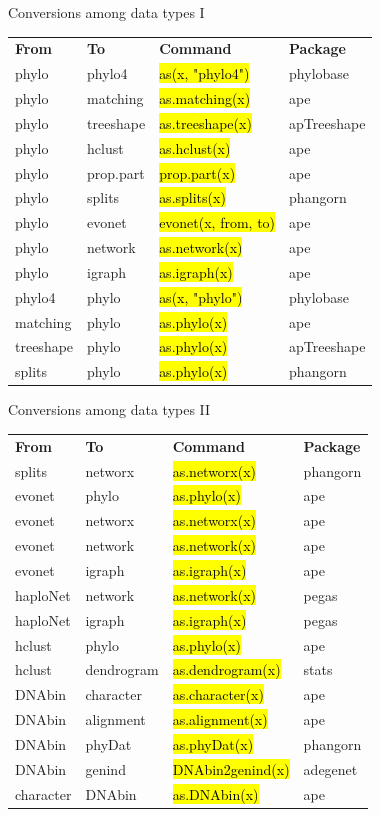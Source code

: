 \documentclass[compress, ucs, xelatex, 11pt, xcolor=svgnames,
  hyperref={
    bookmarks=true,
    unicode=true,
    colorlinks=true,
    pdftitle={Molecular data in R},
    plainpages=false,
    pdfauthor={Vojtech Zeisek},
    pdfsubject={Course about phylogeny and evolution in R},
    pdfcreator={XeLaTeX},
    pdfkeywords={R, evolution, phylogeny, molecular data},
    linkcolor=Tomato,
    anchorcolor=SaddleBrown,
    citecolor=Goldenrod,
    filecolor=DarkMagenta,
    menucolor=Sienna,
    urlcolor=DarkTurquoise,
    pdftex},
  url={hyphens, lowtilde} %
  ]{beamer}
\renewcommand{\texttt}[1]{\hl{\ttfamily #1}}
\begin{document}
\begin{frame}{Conversions among data types I}
  \begin{tabular}{llll}
    \textbf{From} & \textbf{To} & \textbf{Command} & \textbf{Package}\\
    phylo & phylo4 & \texttt{as(x, "phylo4")} & phylobase\\
    phylo & matching & \texttt{as.matching(x)} & ape\\
    phylo & treeshape & \texttt{as.treeshape(x)} & apTreeshape\\
    phylo & hclust & \texttt{as.hclust(x)} & ape\\
    phylo & prop.part & \texttt{prop.part(x)} & ape\\
    phylo & splits & \texttt{as.splits(x)} & phangorn\\
    phylo & evonet & \texttt{evonet(x, from, to)} & ape\\
    phylo & network & \texttt{as.network(x)} & ape\\
    phylo & igraph & \texttt{as.igraph(x)} & ape\\
    phylo4 & phylo & \texttt{as(x, "phylo")} & phylobase\\
    matching & phylo & \texttt{as.phylo(x)} & ape\\
    treeshape & phylo & \texttt{as.phylo(x)} & apTreeshape\\
    splits & phylo & \texttt{as.phylo(x)} & phangorn
  \end{tabular}
\end{frame}

\begin{frame}{Conversions among data types II}
  \begin{tabular}{llll}
    \textbf{From} & \textbf{To} & \textbf{Command} & \textbf{Package}\\
    splits & networx & \texttt{as.networx(x)} & phangorn\\
    evonet & phylo & \texttt{as.phylo(x)} & ape\\
    evonet & networx & \texttt{as.networx(x)} & ape\\
    evonet & network & \texttt{as.network(x)} & ape\\
    evonet & igraph & \texttt{as.igraph(x)} & ape\\
    haploNet & network & \texttt{as.network(x)} & pegas\\
    haploNet & igraph & \texttt{as.igraph(x)} & pegas\\
    hclust & phylo & \texttt{as.phylo(x)} & ape\\
    hclust & dendrogram & \texttt{as.dendrogram(x)} & stats\\
    DNAbin & character & \texttt{as.character(x)} & ape\\
    DNAbin & alignment & \texttt{as.alignment(x)} & ape\\
    DNAbin & phyDat & \texttt{as.phyDat(x)} & phangorn\\
    DNAbin & genind & \texttt{DNAbin2genind(x)} & adegenet\\
    character & DNAbin & \texttt{as.DNAbin(x)} & ape
  \end{tabular}
\end{frame}
\end{document}
